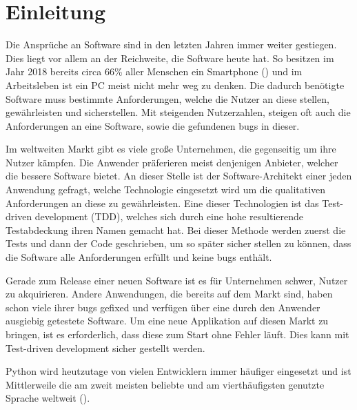 \section*{Einleitung}\label{einleitung}

Die Ansprüche an Software sind in den letzten Jahren immer weiter gestiegen.
Dies liegt vor allem an der Reichweite, die Software heute hat. So besitzen
im Jahr 2018 bereits circa 66\% aller Menschen ein Smartphone
(\cite{FraukeSchobelt:Smartphone}) und im Arbeitsleben ist ein PC meist nicht
mehr weg zu denken. Die dadurch benötigte Software muss bestimmte
Anforderungen, welche die Nutzer an diese stellen, gewährleisten und
sicherstellen. Mit steigenden Nutzerzahlen, steigen oft auch die Anforderungen
an eine Software, sowie die gefundenen \Glspl{bug} in dieser.

Im weltweiten Markt gibt es viele große Unternehmen, die gegenseitig um ihre
Nutzer kämpfen. Die Anwender präferieren meist denjenigen Anbieter, welcher die
bessere Software bietet. An dieser Stelle ist der Software-Architekt einer
jeden Anwendung gefragt, welche Technologie eingesetzt wird um die qualitativen
Anforderungen an diese zu gewährleisten. Eine dieser Technologien ist das
Test-driven development (TDD), welches sich durch eine hohe resultierende
Testabdeckung ihren Namen gemacht hat. Bei dieser Methode werden zuerst die
Tests und dann der Code geschrieben, um so später sicher stellen zu können,
dass die Software alle Anforderungen erfüllt und keine \Glspl{bug} enthält.

Gerade zum Release einer neuen Software ist es für Unternehmen schwer, Nutzer
zu akquirieren. Andere Anwendungen, die bereits auf dem Markt sind, haben
schon viele ihrer \Glspl{bug} gefixed und verfügen über eine durch den
Anwender ausgiebig getestete Software. Um eine neue Applikation auf diesen
Markt zu bringen, ist es erforderlich, dass diese zum Start ohne Fehler läuft.
Dies kann mit Test-driven development sicher gestellt werden.

Python wird heutzutage von vielen Entwicklern immer häufiger eingesetzt
und ist Mittlerweile die am zweit meisten beliebte und am vierthäufigsten
genutzte Sprache weltweit (\cite{stackoverflow:2019}).

